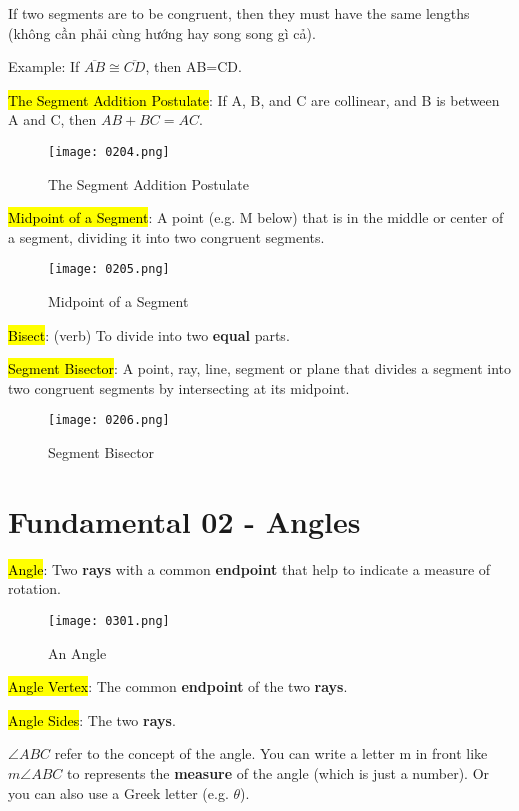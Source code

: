 If two segments are to be congruent, then they must have the same lengths (không cần phải cùng hướng hay song song gì cả).

Example: If $\overline{AB} \cong \overline{CD}$, then AB=CD.

\hl{The Segment Addition Postulate}: If A, B, and C are collinear, and B is between A and C, then $AB + BC = AC$.

\begin{figure}[h]
  \centering
  \texttt{[image: 0204.png]}
  \caption{The Segment Addition Postulate}
\end{figure}

\hl{Midpoint of a Segment}: A point (e.g. M below) that is in the middle or center of a segment, dividing it into two congruent segments.

\begin{figure}[h]
  \centering
  \texttt{[image: 0205.png]}
  \caption{Midpoint of a Segment}
\end{figure}

\hl{Bisect}: (verb) To divide into two \textbf{equal} parts.

\hl{Segment Bisector}: A point, ray, line, segment or plane that divides a segment into two congruent segments by intersecting at its midpoint.

\begin{figure}[htb!]
  \centering
  \texttt{[image: 0206.png]}
  \caption{Segment Bisector}
\end{figure}

\section{Fundamental 02 - Angles}

\hl{Angle}: Two \textbf{rays} with a common \textbf{endpoint} that help to indicate a measure of rotation.

\begin{figure}[htb!]
  \centering
  \texttt{[image: 0301.png]}
  \caption{An Angle}
\end{figure}

\hl{Angle Vertex}: The common \textbf{endpoint} of the two \textbf{rays}.

\hl{Angle Sides}: The two \textbf{rays}.

$\angle ABC$ refer to the concept of the angle. You can write a letter m in front like $m\angle ABC$ to represents the \textbf{measure} of the angle (which is just a number). Or you can also use a Greek letter (e.g. $\theta$).

